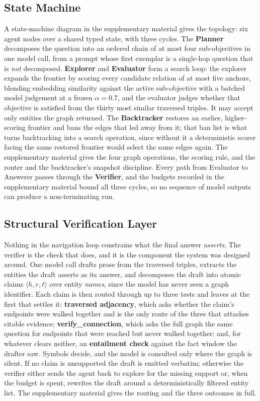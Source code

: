 \subsection{State Machine}\label{sec:statemachine}

A state-machine diagram in the supplementary material gives the
topology: six agent nodes over a shared typed state, with three cycles.
The \textbf{Planner} decomposes the question into an ordered chain of at
most four sub-objectives in one model call, from a prompt whose first
exemplar is a single-hop question that is \emph{not} decomposed.
\textbf{Explorer} and \textbf{Evaluator} form a search loop: the
explorer expands the frontier by scoring every candidate relation of at
most five anchors, blending embedding similarity against the active
sub-objective with a batched model judgement at a frozen $\alpha = 0.7$,
and the evaluator judges whether that objective is satisfied from the
thirty most similar traversed triples. It may accept only entities the
graph returned. The \textbf{Backtracker} restores an earlier,
higher-scoring frontier and bans the edges that led away from it; that
ban list is what turns backtracking into a search operation, since
without it a deterministic scorer facing the same restored frontier
would select the same edges again. The supplementary material gives the
four graph operations, the scoring rule, and the router and the
backtracker's snapshot discipline. Every path from Evaluator to Answerer
passes through the \textbf{Verifier}, and the budgets recorded in the
supplementary material bound all three cycles, so no sequence of model
outputs can produce a non-terminating run.

\subsection{Structural Verification Layer}\label{sec:verification}

Nothing in the navigation loop constrains what the final answer
\emph{asserts}. The verifier is the check that does, and it is the
component the system was designed around. One model call drafts prose
from the traversed triples, extracts the entities the draft asserts as
its answer, and decomposes the draft into atomic claims $\langle h, r, t
\rangle$ over entity \emph{names}, since the model has never seen a
graph identifier. Each claim is then routed through up to three tests
and leaves at the first that settles it: \textbf{traversed adjacency},
which asks whether the claim's endpoints were walked together and is the
only route of the three that attaches citable evidence;
\textbf{\textsf{verify\_connection}}, which asks the full graph the same
question for endpoints that were reached but never walked together; and,
for whatever clears neither, an \textbf{entailment check} against the
fact window the drafter saw. Symbols decide, and the model is consulted
only where the graph is silent. If no claim is unsupported the draft is
emitted verbatim; otherwise the verifier either sends the agent back to
explore for the missing support or, when the budget is spent, rewrites
the draft around a deterministically filtered entity list. The
supplementary material gives the routing and the three outcomes in full.

